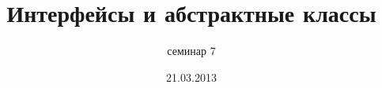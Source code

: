\documentclass[hyperref={unicode,colorlinks=true,urlbordercolor=blue,linkcolor=blue,urlcolor=blue,pdfborderstyle={/S/U/W 1}}]{beamer}
\title{Интерфейсы и абстрактные классы}
\subtitle{семинар 7}
\date{21.03.2013}
\begin{document}
\frame{\titlepage}


\end{document}
